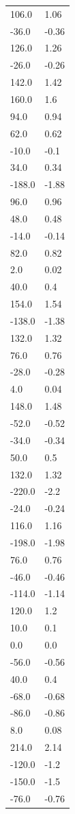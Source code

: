 \begin{longtable}{ll}
106.0 & 1.06 \\
-36.0 & -0.36 \\
126.0 & 1.26 \\
-26.0 & -0.26 \\
142.0 & 1.42 \\
160.0 & 1.6 \\
94.0 & 0.94 \\
62.0 & 0.62 \\
-10.0 & -0.1 \\
34.0 & 0.34 \\
-188.0 & -1.88 \\
96.0 & 0.96 \\
48.0 & 0.48 \\
-14.0 & -0.14 \\
82.0 & 0.82 \\
2.0 & 0.02 \\
40.0 & 0.4 \\
154.0 & 1.54 \\
-138.0 & -1.38 \\
132.0 & 1.32 \\
76.0 & 0.76 \\
-28.0 & -0.28 \\
4.0 & 0.04 \\
148.0 & 1.48 \\
-52.0 & -0.52 \\
-34.0 & -0.34 \\
50.0 & 0.5 \\
132.0 & 1.32 \\
-220.0 & -2.2 \\
-24.0 & -0.24 \\
116.0 & 1.16 \\
-198.0 & -1.98 \\
76.0 & 0.76 \\
-46.0 & -0.46 \\
-114.0 & -1.14 \\
120.0 & 1.2 \\
10.0 & 0.1 \\
0.0 & 0.0 \\
-56.0 & -0.56 \\
40.0 & 0.4 \\
-68.0 & -0.68 \\
-86.0 & -0.86 \\
8.0 & 0.08 \\
214.0 & 2.14 \\
-120.0 & -1.2 \\
-150.0 & -1.5 \\
-76.0 & -0.76 \\

\end{longtable}
